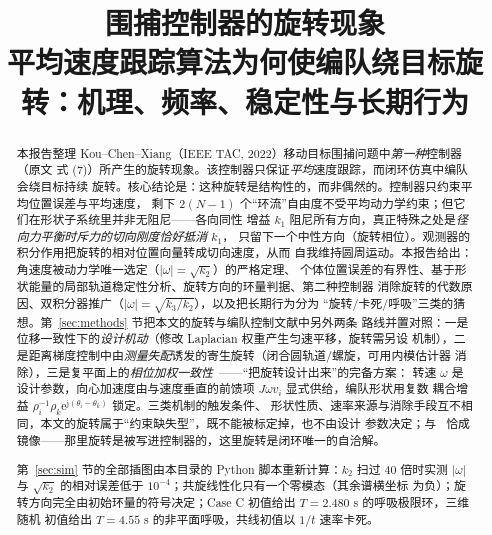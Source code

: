 \documentclass[11pt,a4paper]{ctexart}
\title{\bfseries 围捕控制器的旋转现象\\[0.3em]
\large 平均速度跟踪算法为何使编队绕目标旋转：机理、频率、稳定性与长期行为}
\author{}
\date{}
\theoremstyle{plain}
\theoremstyle{definition}
\theoremstyle{remark}
\newcommand{\abs}[1]{\left|#1\right|}
\begin{document}
\maketitle

\begin{abstract}
\noindent
本报告整理 Kou--Chen--Xiang（IEEE TAC, 2022）移动目标围捕问题中\emph{第一种}控制器（原文
式 (7)）所产生的旋转现象。该控制器只保证\emph{平均}速度跟踪，而闭环仿真中编队会绕目标持续
旋转。核心结论是：这种旋转是结构性的，而非偶然的。控制器只约束平均位置误差与平均速度，
剩下 $2(N-1)$ 个“环流”自由度不受平均动力学约束；但它们在形状子系统里并非无阻尼——各向同性
增益 $k_1$ 阻尼所有方向，真正特殊之处是\emph{径向力平衡时斥力的切向刚度恰好抵消 $k_1$}，
只留下一个中性方向（旋转相位）。观测器的积分作用把旋转的相对位置向量转成切向速度，从而
自我维持圆周运动。本报告给出：角速度被动力学唯一选定（$|\omega|=\sqrt{k_2}$）的严格定理、
个体位置误差的有界性、基于形状能量的局部轨道稳定性分析、旋转方向的环量判据、第二种控制器
消除旋转的代数原因、双积分器推广（$|\omega|=\sqrt{k_3/k_2}$），以及把长期行为分为
“旋转/卡死/呼吸”三类的猜想。第~\ref{sec:methods} 节把本文的旋转与编队控制文献中另外两条
路线并置对照：一是位移一致性下的\emph{设计机动}（修改 Laplacian 权重产生匀速平移，旋转需另设
机制），二是距离梯度控制中由\emph{测量失配}诱发的寄生旋转（闭合圆轨道/螺旋，可用内模估计器
消除），三是复平面上的\emph{相位加权一致性}~\cite{lin2010}——“把旋转设计出来”的完备方案：
转速 $\omega$ 是设计参数，向心加速度由与速度垂直的前馈项 $J\omega v_i$ 显式供给，编队形状用复数
耦合增益 $\rho_i^{-1}\rho_k\mathrm e^{\mathrm j(\theta_i-\theta_k)}$ 锁定。三类机制的触发条件、
形状性质、速率来源与消除手段互不相同，本文的旋转属于“约束缺失型”，既不能被标定掉，也不由设计
参数决定；与~\cite{lin2010} 恰成镜像——那里旋转是被写进控制器的，这里旋转是闭环唯一的自洽解。

第~\ref{sec:sim} 节的全部插图由本目录的 Python 脚本重新计算：$k_2$ 扫过 $40$ 倍时实测
$\abs{\omega}$ 与 $\sqrt{k_2}$ 的相对误差低于 $10^{-4}$；共旋线性化只有一个零模态（其余谱横坐标
为负）；旋转方向完全由初始环量的符号决定；Case C 初值给出 $T=2.480$ s 的呼吸极限环，三维随机
初值给出 $T=4.55$ s 的非平面呼吸，共线初值以 $1/t$ 速率卡死。
\end{abstract}
\end{document}
